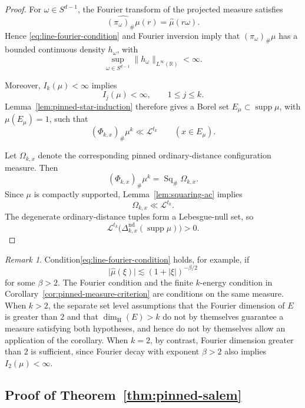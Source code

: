 \documentclass[11pt]{article}
\theoremstyle{remark}
\newtheorem{remark}[theorem]{Remark}
\newcommand{\R}{\mathbb R}
\newcommand{\cL}{\mathcal L}
\newcommand{\supp}{\operatorname{supp}}
\newcommand{\wh}{\widehat}
\numberwithin{equation}{section}
\newcommand{\1}{\mathbf 1}
\begin{document}
\begin{proof}
For \(\omega\in S^{d-1}\), the Fourier transform of the projected
measure satisfies
\[
\widehat{(\pi_\omega)_\#\mu}(r)
=
\widehat{\mu}(r\omega).
\]
Hence \eqref{eq:line-fourier-condition} and Fourier inversion imply
that \((\pi_\omega)_\#\mu\) has a bounded continuous density
\(h_\omega\), with
\[
\sup_{\omega\in S^{d-1}}
\|h_\omega\|_{L^\infty(\R)}
<\infty.
\]

Moreover, \(I_k(\mu)<\infty\) implies
\[
I_j(\mu)<\infty,
\qquad 1\leq j\leq k.
\]
Lemma~\ref{lem:pinned-star-induction} therefore gives a Borel set
\(E_\mu\subset\supp\mu\), with \(\mu(E_\mu)=1\), such that
\[
(\Phi_{k,x})_\#\mu^k\ll\cL^{t_k}
\qquad (x\in E_\mu).
\]

Let \(\Omega_{k,x}\) denote the corresponding pinned ordinary-distance
configuration measure. Then
\[
(\Phi_{k,x})_\#\mu^k
=
\operatorname{Sq}_\#\Omega_{k,x}.
\]
Since \(\mu\) is compactly supported, Lemma~\ref{lem:squaring-ac}
implies
\[
\Omega_{k,x}\ll\cL^{t_k}.
\]
The degenerate ordinary-distance tuples form a Lebesgue-null set, so
\[
\cL^{t_k}
\bigl(
\Delta^{\mathrm{nd}}_{k,x}(\supp\mu)
\bigr)>0.
\]
\end{proof}











\begin{remark}
\label{rem:pinned-measure-hypotheses}
Condition\eqref{eq:line-fourier-condition} holds, for example, if
\[
\lvert\wh\mu(\xi)\rvert
\lesssim
(1+\lvert\xi\rvert)^{-\beta/2}
\]
for some \(\beta>2\). The Fourier condition and the finite
\(k\)-energy condition in Corollary~\ref{cor:pinned-measure-criterion}
are conditions on the same measure. When \(k>2\), the separate
set level assumptions that the Fourier dimension of \(E\) is greater
than \(2\) and that \(\dim_{\mathrm H}(E)>k\) do not by themselves
guarantee a measure satisfying both hypotheses, and hence do not by
themselves allow an application of the corollary. When \(k=2\), by
contrast, Fourier dimension greater than \(2\) is sufficient, since
Fourier decay with exponent \(\beta>2\) also implies
\(I_2(\mu)<\infty\).
\end{remark}

\subsection{Proof of Theorem~\ref{thm:pinned-salem}}
\end{document}
